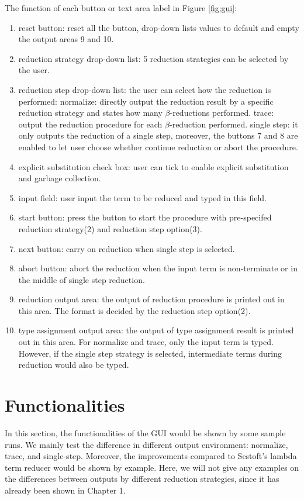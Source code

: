 \noindent The function of each button or text area label in Figure \ref{fig:gui}:
\begin{enumerate}
\item reset button: reset all the button, drop-down lists values to default and empty the output areas 9 and 10.
\item reduction strategy drop-down list: 5 reduction strategies can be selected by the user.
\item reduction step drop-down list: the user can select how the reduction is performed: normalize: directly output the reduction result by a specific reduction strategy and states how many $\beta$-reductions performed. trace: output the reduction procedure for each $\beta$-reduction performed. single step: it only outputs the reduction of a single step, moreover, the buttons 7 and 8 are enabled to let user choose whether continue reduction or abort the procedure.  
\item explicit substitution check box: user can tick to enable explicit substitution and garbage collection.
\item input field: user input the term to be reduced and typed in this field.
\item start button: press the button to start the procedure with pre-specifed reduction strategy(2) and reduction step option(3).
\item next button: carry on reduction when single step is selected.
\item abort button: abort the reduction when the input term is non-terminate or in the middle of single step reduction.
\item reduction output area: the output of reduction procedure is printed out in this area. The format is decided by the reduction step option(2).
\item type assignment output area: the output of type assignment result is printed out in this area. For normalize and trace, only the input term is typed. However, if the single step strategy is selected, intermediate terms during reduction would also be typed.
\end{enumerate}


\section{Functionalities}

In this section, the functionalities of the GUI would be shown by some sample runs. We mainly test the difference in different output environment: normalize, trace, and single-step. Moreover, the improvements compared to Sestoft's lambda term reducer would be shown by example. Here, we will not give any examples on the differences between outputs by different reduction strategies, since it has already been shown in Chapter 1. 

